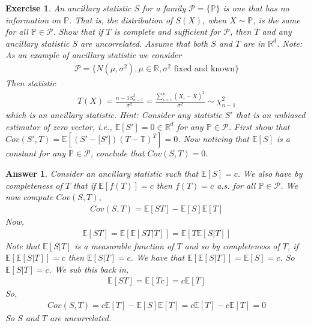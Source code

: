 \documentclass[12pt]{article}
\theoremstyle{colon}
\newtheorem{exercise}{Exercise}
\newtheorem*{answer}{Answer}
\begin{document}
\begin{exercise}
  An ancillary statistic $S$ for a family $\mathcal{P} = \{ \mathbb{P} \}$ is one that has no information on $\mathbb{P}$. That is, the distribution of $S(X)$, when $X \sim \mathbb{P}$, is the same for all $\mathbb{P} \in \mathcal{P}$. Show that if $T$ is complete and sufficient for $\mathcal{P}$, then $T$ and any ancillary statistic $S$ are uncorrelated. Assume that both $S$ and $T$ are in $\mathbb{R}^d$. Note: As an example of ancillary statistic we consider
  \begin{gather*}
    \mathcal{P} = \{ N(\mu, \sigma^2), \mu \in \mathbb{R}, \sigma^2 \text{ fixed and known} \}
  \end{gather*}
  Then statistic
  \begin{gather*}
    T(X) = \frac{n-1S_{n-1}^2}{\sigma^2} = \frac{\sum_{i=1}^n(X_i-\bar{X})^2}{\sigma^2} \sim \chi_{n-1}^2
  \end{gather*}
  which is an ancillary statistic.
  Hint: Consider any statistic $S'$ that is an unbiased estimator of zero vector, i.e., $\mathbb{E}[S'] = 0 \in \mathbb{R}^d$ for any $\mathbb{P} \in \mathcal{P}$. First show that $Cov(S',T) = \mathbb{E}[(S'-\mathbb[S'])(T-\mathbb{T})^T]=0$. Now noticing that $\mathbb{E}[S]$ is a constant for any $\mathbb{P} \in \mathcal{P}$, conclude that $Cov(S,T) = 0$.
\end{exercise}

\begin{answer}
  Consider an ancillary statistic such that $\mathbb{E}[S] = c$. We also have by completeness of $T$ that if $\mathbb{E}[f(T)] = c$ then $f(T) = c$ a.s. for all $\mathbb{P} \in \mathcal{P}$. We now compute $Cov(S,T)$,
  \begin{gather*}
    Cov(S,T) = \mathbb{E}[ST] - \mathbb{E}[S]\mathbb{E}[T]
  \end{gather*}
  Now,
  \begin{gather*}
    \mathbb{E}[ST] = \mathbb{E}[\mathbb{E}[ST|T]] = \mathbb{E}[T \mathbb{E}[S|T]]
  \end{gather*}
  Note that $\mathbb{E}[S|T]$ is a measurable function of $T$ and so by completeness of $T$, if $\mathbb{E}[\mathbb{E}[S|T]] = c$ then $\mathbb{E}[S|T] = c$. We have that $\mathbb{E}[\mathbb{E}[S|T]] = \mathbb{E}[S] = c$. So $\mathbb{E}[S|T] = c$. We sub this back in,
  \begin{gather*}
    \mathbb{E}[ST] = \mathbb{E}[T c] = c \mathbb{E}[T]
  \end{gather*}
  So,
  \begin{gather*}
    Cov(S,T) = c \mathbb{E}[T] - \mathbb{E}[S]\mathbb{E}[T] = c \mathbb{E}[T] - c \mathbb{E}[T] = 0
  \end{gather*}
  So $S$ and $T$ are uncorrelated.
\end{answer}
\end{document}
